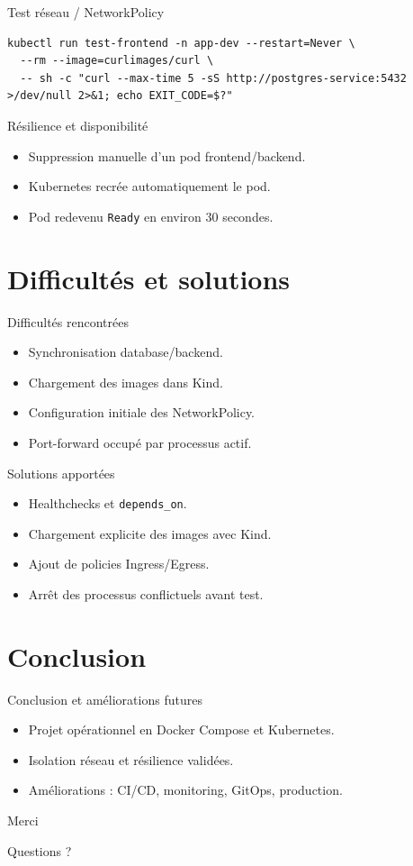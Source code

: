 \documentclass[11pt]{beamer}
\begin{document}
\begin{frame}[fragile]{Test réseau / NetworkPolicy}
\begin{lstlisting}
kubectl run test-frontend -n app-dev --restart=Never \
  --rm --image=curlimages/curl \
  -- sh -c "curl --max-time 5 -sS http://postgres-service:5432 >/dev/null 2>&1; echo EXIT_CODE=$?"
\end{lstlisting}
\end{frame}

\begin{frame}{Résilience et disponibilité}
  \begin{itemize}
    \item Suppression manuelle d'un pod frontend/backend.
    \item Kubernetes recrée automatiquement le pod.
    \item Pod redevenu \texttt{Ready} en environ 30 secondes.
  \end{itemize}
\end{frame}

\section{Difficultés et solutions}
\begin{frame}{Difficultés rencontrées}
  \begin{itemize}
    \item Synchronisation database/backend.
    \item Chargement des images dans Kind.
    \item Configuration initiale des NetworkPolicy.
    \item Port-forward occupé par processus actif.
  \end{itemize}
\end{frame}

\begin{frame}{Solutions apportées}
  \begin{itemize}
    \item Healthchecks et \texttt{depends\_on}.
    \item Chargement explicite des images avec Kind.
    \item Ajout de policies Ingress/Egress.
    \item Arrêt des processus conflictuels avant test.
  \end{itemize}
\end{frame}

\section{Conclusion}
\begin{frame}{Conclusion et améliorations futures}
  \begin{itemize}
    \item Projet opérationnel en Docker Compose et Kubernetes.
    \item Isolation réseau et résilience validées.
    \item Améliorations : CI/CD, monitoring, GitOps, production.
  \end{itemize}
\end{frame}

\begin{frame}{Merci}
  \begin{center}
    \Large Questions ?
  \end{center}
\end{frame}
\end{document}
